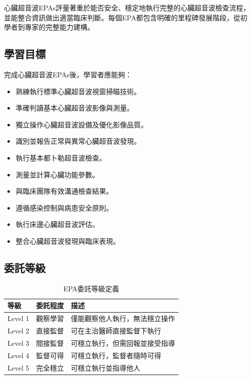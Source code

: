 \documentclass[12pt,a4paper]{article}
\newcommand{\note}[1]{
    \par
    \noindent
    \begin{tcolorbox}[
        colback=emergency_blue!5!white,
        colframe=emergency_blue,
        title=\textbf{重點提醒},
        fonttitle=\bfseries,
        boxrule=0.5pt,
        arc=3pt,
        left=6pt,
        right=6pt,
        top=6pt,
        bottom=6pt
    ]
    #1
    \end{tcolorbox}
}
\begin{document}
\vspace{0.5cm}
\note{
心臟超音波EPAs評量著重於能否安全、穩定地執行完整的心臟超音波檢查流程，並能整合資訊做出適當臨床判斷。每個EPA都包含明確的里程碑發展階段，從初學者到專家的完整能力建構。
}

\subsection{學習目標}
完成心臟超音波EPAs後，學習者應能夠：
\begin{itemize}[nosep]
    \item 熟練執行標準心臟超音波視窗掃瞄技術。
    \item 準確判讀基本心臟超音波影像與測量。
    \item 獨立操作心臟超音波設備及優化影像品質。
    \item 識別並報告正常與異常心臟超音波發現。
    \item 執行基本都卜勒超音波檢查。
    \item 測量並計算心臟功能參數。
    \item 與臨床團隊有效溝通檢查結果。
    \item 遵循感染控制與病患安全原則。
    \item 執行床邊心臟超音波評估。
    \item 整合心臟超音波發現與臨床表現。
\end{itemize}

\subsection{委託等級}
\begin{table}[h]
    \centering
    \caption{EPA委託等級定義}
    \begin{tabular}{p{2cm} p{3cm} p{9cm}}
        \toprule
        \textbf{等級} & \textbf{委託程度} & \textbf{描述} \\
        \midrule
        Level 1 & 觀察學習 & 僅能觀察他人執行，無法穩立操作 \\
        Level 2 & 直接監督 & 可在主治醫師直接監督下執行 \\
        Level 3 & 間接監督 & 可穩立執行，但需回報並接受指導 \\
        Level 4 & 監督可得 & 可穩立執行，監督者隨時可得 \\
        Level 5 & 完全穩立 & 可穩立執行並指導他人 \\
        \bottomrule
    \end{tabular}
\end{table}
\end{document}
